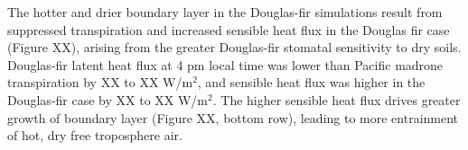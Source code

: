 The hotter and drier boundary layer in the Douglas-fir simulations result from suppressed transpiration and increased sensible heat flux in the Douglas fir case (Figure XX), arising from the greater Douglas-fir stomatal sensitivity to dry soils.   Douglas-fir latent heat flux at 4 pm local time was lower than Pacific madrone transpiration by XX to XX W/m$^2$, and sensible heat flux was higher in the Douglas-fir case by XX to XX W/m$^2$.  The higher sensible heat flux drives greater growth of boundary layer (Figure XX, bottom row), leading to more entrainment of hot, dry free troposphere air.


